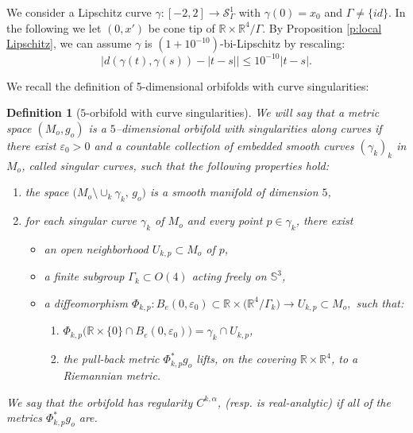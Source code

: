 \documentclass[11pt,reqno]{amsart}
\numberwithin{equation}{section}
\newcommand{\RR}{\mathds{R}}
\newcommand{\cS}{\mathcal{S}}
\newtheorem{defn}[thm]{Definition}
\theoremstyle{definition}
\theoremstyle{remark}
\begin{document}
We consider a Lipschitz curve $\gamma: [-2,2] \to \cS^1_{\Gamma}$ with $\gamma(0) = x_0$ and $\Gamma \neq \{id\}$. In the following we let $(0,x')$ be cone tip of $\RR \times \RR^4/\Gamma$. By Proposition \ref{p:local Lipschitz}, we can assume $\gamma$ is $(1+10^{-10})$-bi-Lipschitz by rescaling: 
\begin{equation}\label{e:glue;curve lip}
        \Big| d(\gamma(t),\gamma(s)) - |t-s|\Big| \leqslant 10^{-10} |t-s|.
    \end{equation}

We recall the definition of 5-dimensional orbifolds with curve singularities:
\begin{defn}[$5$-orbifold with curve singularities]\label{orb Ein curve}
    We will say that a metric space $(M_o,g_o)$ is a $5$--dimensional orbifold
    with singularities along curves if there exist $\varepsilon_0>0$ and a countable
    collection of embedded smooth curves $(\gamma_k)_k$ in $M_o$, called
    \emph{singular curves}, such that the following properties hold:
    \begin{enumerate}
        \item the space $\bigl(M_o\setminus\cup_k \gamma_k,\,g_o\bigr)$ is a smooth
        manifold of dimension $5$,
        \item for each singular curve $\gamma_k$ of $M_o$ and every point
        $p\in\gamma_k$, there exist
        \begin{itemize}
            \item an open neighborhood $U_{k,p}\subset M_o$ of $p$,
            \item a finite subgroup $\Gamma_k\subset O(4)$ acting freely on $\mathbb{S}^3$,
            \item a diffeomorphism
            $\Phi_{k,p} \colon B_e(0,\varepsilon_0)\subset
                \mathbb{R}\times\bigl(\mathbb{R}^4/\Gamma_k\bigr) \longrightarrow
                U_{k,p}\subset M_o,$ such that:
        \begin{enumerate}
            \item[(a)] $\Phi_{k,p}\bigl( \mathbb{R}\times\{0\} \cap B_e(0,\varepsilon_0)\bigr)
            = \gamma_k\cap U_{k,p}$,
            \item[(b)] the pull-back metric $\Phi_{k,p}^*g_o$ lifts, on the covering
            $\mathbb{R}\times\mathbb{R}^4$, to a Riemannian metric.
        \end{enumerate}
        \end{itemize}
    \end{enumerate}
    
We say that the orbifold has regularity $C^{k,\alpha}$, (resp. is real-analytic) if all of the metrics $\Phi_{k,p}^*g_o$ are.
\end{defn}
\end{document}

